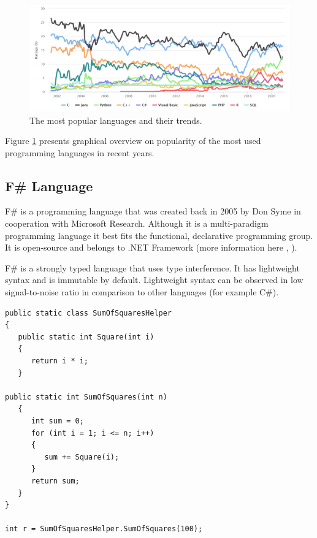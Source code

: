     \begin{figure}[H]
        \centering
        \includegraphics[width=\textwidth]{img/tiobe_index.png}
        \caption{The most popular languages and their trends.}
        \label{fig:tioebeIndex}
    \end{figure}
    
    \noindent
    Figure \ref{fig:tioebeIndex} presents graphical overview on popularity of the most used programming languages in recent years.

\subsection{F\# Language}
    F\# is a programming language that was created back in 2005 by Don Syme in cooperation with Microsoft Research. Although it is a multi-paradigm programming language it best fits the functional, declarative programming group. It is open-source and belongs to .NET Framework (more information here \cite{WhatIsFSharp},  \cite{FSharpWiki}).
    
    F\# is a strongly typed language that uses type interference. It has lightweight syntax and is immutable by default. Lightweight syntax can be observed in low signal-to-noise ratio in comparison to other languages (for example C\#).
    
    \begin{lstlisting}[caption=C\# code example]
public static class SumOfSquaresHelper
{
   public static int Square(int i)
   {
      return i * i;
   }

public static int SumOfSquares(int n)
   {
      int sum = 0;
      for (int i = 1; i <= n; i++)
      {
         sum += Square(i);
      }
      return sum;
   }
}

int r = SumOfSquaresHelper.SumOfSquares(100);
    \end{lstlisting}
    
